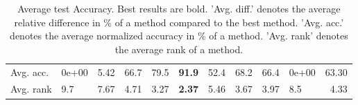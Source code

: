 \begin{table}[ht!]
\begin{tabular}{llrlllllllr}
  Avg. acc. & 0e+00 & 5.42 & 66.7 & 79.5 & \textbf{91.9} & 52.4 & 68.2 & 66.4 & 0e+00 & 63.30 \\ 
  Avg. rank & 9.7 & 7.67 & 4.71 & 3.27 & \textbf{2.37} & 5.46 & 3.67 & 3.97 & 8.5 & 4.33 \\ 
   \hline
\hline
\end{tabular}
\endgroup
\caption{Average test Accuracy. 
                  Best results are bold. 
                  'Avg. diff.' denotes the average relative difference in \% of a method compared to the best method.
                  'Avg. acc.' denotes the average normalized accuracy in \% of a method.
                  'Avg. rank' denotes the average rank of a method.} 
\label{TABLES/table_results_Accuracy_clustering}
\end{table}
